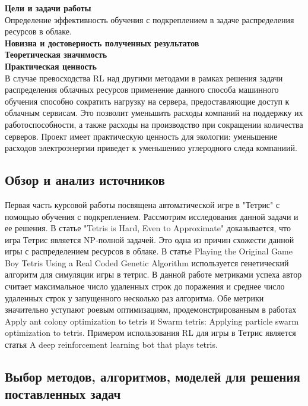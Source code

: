 \documentclass{article}
\begin{document}
\textbf{Цели и задачи работы}\\
Определение эффективность обучения с подкреплением в задаче распределения ресурсов в облаке.\\
\textbf{Новизна и достоверность полученных результатов}\\
\textbf{Теоретическая значимость}\\
\textbf{Практическая ценность}\\
В случае превосходства RL над другими методами в рамках решения задачи распределения облачных ресурсов применение данного способа машинного обучения способно сократить нагрузку на сервера, предоставляющие доступ к облачным сервисам. Это позволит уменьшить расходы компаний на поддержку их работоспособности, а также расходы на производство при сокращении количества серверов. Проект имеет практическую ценность для экологии: уменьшение расходов электроэнергии приведет к уменьшению углеродного следа компаниий.	\\
\newpage
\begin{center}
\section {Обзор и анализ источников}
\end{center}
Первая часть курсовой работы посвящена автоматической игре в "Тетрис" с помощью обучения с подкреплением. Рассмотрим исследования данной задачи и ее решения. В статье "Tetris is Hard, Even to Approximate"\cite{litlink6} доказывается, что игра Тетрис является NP-полной задачей. Это одна из причин схожести данной игры с распределением ресурсов в облаке\cite{litlink6}. В статье Playing the Original Game Boy Tetris Using a Real Coded Genetic Algorithm\cite{litlink7} используется генетический алгоритм для симуляции игры в тетрис. В данной работе метриками успеха автор считает максимальное число удаленных строк до поражения и среднее число удаленных строк у запущенного несколько раз алгоритма. Обе метрики значительно уступают роевым оптимизациям,  продемонстрированным в работах Apply ant colony optimization to tetris\cite{litlink19} и Swarm tetris: Applying particle swarm optimization to tetris\cite{litlink10}. Примером использования RL для игры в Тетрис является статья A deep reinforcement learning bot that plays tetris\cite{litlink13}.
\newpage
\begin{center}
\section {Выбор методов, алгоритмов, моделей для решения поставленных задач}
\end{center}
\end{document}
